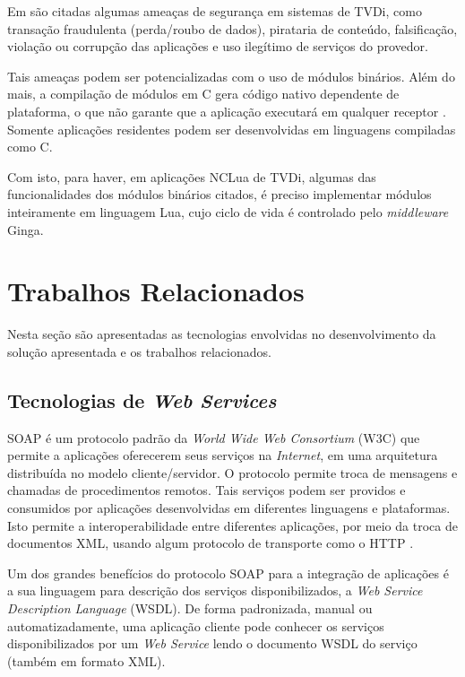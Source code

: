 Em \cite{braga-introducao} são citadas algumas ameaças de segurança em sistemas de TVDi, como 
transação fraudulenta (perda/roubo de dados), pirataria de conteúdo,  falsificação, violação ou corrupção das aplicações 
e uso ilegítimo de serviços do provedor.

Tais ameaças podem ser potencializadas com o uso de módulos binários. Além do mais, a compilação de módulos em C gera código nativo dependente de plataforma, o que não garante que a aplicação executará em qualquer receptor \cite{costa-seguranca}.
Somente aplicações residentes podem ser desenvolvidas em linguagens compiladas como C.

Com isto, para haver, em aplicações NCLua de TVDi, algumas das funcionalidades dos módulos binários citados, é preciso
implementar módulos inteiramente em linguagem Lua, cujo ciclo de vida é controlado pelo \textit{middleware} Ginga\cite{abnt200815606}.

\section{Trabalhos Relacionados} \label{sec:trabs-rel}

Nesta seção são apresentadas as tecnologias envolvidas no desenvolvimento da solução
apresentada e os trabalhos relacionados.

\subsection{Tecnologias de \textit{Web Services}} \label{sec:ws}

SOAP é um protocolo padrão da \textit{World Wide Web Consortium} (W3C) que permite a aplicações oferecerem seus serviços na \textit{Internet}, em uma arquitetura distribuída no modelo cliente/servidor. O protocolo permite troca de mensagens e chamadas de procedimentos remotos. 
Tais serviços podem ser providos e consumidos por aplicações desenvolvidas em diferentes linguagens e plataformas. 
Isto permite a interoperabilidade entre diferentes aplicações, por meio da troca de documentos XML, 
usando algum protocolo de transporte como o HTTP \cite{soap-spec} \cite{curbera2002unraveling} \cite{newcomer2002understanding}.

Um dos grandes benefícios do protocolo SOAP para a integração de aplicações é a 
sua linguagem para descrição dos serviços disponibilizados, a \textit{Web Service Description Language} (WSDL).
De forma padronizada, manual ou automatizadamente, uma aplicação cliente pode conhecer os serviços
disponibilizados por um \textit{Web Service} lendo o documento WSDL do serviço (também em formato XML)\cite{soap-spec}.

